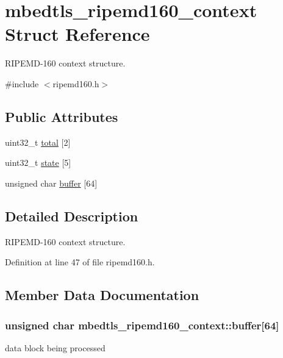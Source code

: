 \hypertarget{structmbedtls__ripemd160__context}{\section{mbedtls\-\_\-ripemd160\-\_\-context Struct Reference}
\label{structmbedtls__ripemd160__context}
}


R\-I\-P\-E\-M\-D-\/160 context structure.  




{\ttfamily \#include $<$ripemd160.\-h$>$}

\subsection*{Public Attributes}
\begin{DoxyCompactItemize}
\item 
uint32\-\_\-t \hyperlink{structmbedtls__ripemd160__context_afc1ec88d27b692be26d819a752be8d4a}{total} \mbox{[}2\mbox{]}
\item 
uint32\-\_\-t \hyperlink{structmbedtls__ripemd160__context_af56cf97ec4c54ae4bb540422b459782c}{state} \mbox{[}5\mbox{]}
\item 
unsigned char \hyperlink{structmbedtls__ripemd160__context_adc89115c7d047411c730324f779fae13}{buffer} \mbox{[}64\mbox{]}
\end{DoxyCompactItemize}


\subsection{Detailed Description}
R\-I\-P\-E\-M\-D-\/160 context structure. 

Definition at line 47 of file ripemd160.\-h.



\subsection{Member Data Documentation}
\hypertarget{structmbedtls__ripemd160__context_adc89115c7d047411c730324f779fae13}{
\subsubsection[{buffer}]{\setlength{\rightskip}{0pt plus 5cm}unsigned char mbedtls\-\_\-ripemd160\-\_\-context\-::buffer\mbox{[}64\mbox{]}}}\label{structmbedtls__ripemd160__context_adc89115c7d047411c730324f779fae13}
data block being processed 

